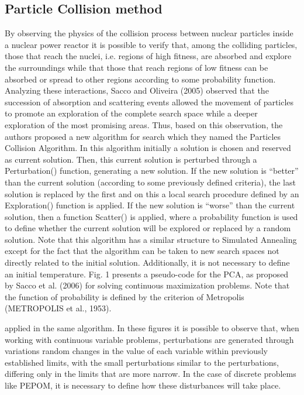 \subsection{Particle Collision method}
\label{sec:PC}

By observing the physics of the collision process between nuclear particles inside a nuclear power reactor it is possible to verify that, among the colliding particles, those that reach the nuclei, i.e. regions of high fitness, are absorbed and explore the surroundings while that those that reach regions of low fitness can be absorbed or spread to other regions according to some probability function. Analyzing these interactions, Sacco and Oliveira (2005) observed that the succession of absorption and scattering events allowed the movement of particles to promote an exploration of the complete search space while a deeper exploration of the most promising areas. Thus, based on this observation, the authors proposed a new algorithm for search which they named the Particles Collision Algorithm. In this algorithm initially a solution is chosen and reserved as current solution. Then, this current solution is perturbed through a Perturbation() function, generating a new solution. If the new solution is “better” than the current solution (according to some previously defined criteria), the last solution is replaced by the first and on this a local search procedure defined by an Exploration() function is applied. If the new solution is “worse” than the current solution, then a function Scatter() is applied, where a probability function is used to define whether the current solution will be explored or replaced by a random solution. Note that this algorithm has a similar structure to Simulated Annealing except for the fact that the algorithm can be taken to new search spaces not directly related to the initial solution. Additionally, it is not necessary to define an initial temperature. Fig. 1 presents a pseudo-code for the PCA, as proposed by Sacco et al. (2006) for solving continuous maximization problems. Note that the function of probability is defined by the criterion of Metropolis (METROPOLIS et al., 1953). 


applied in the same algorithm. In these figures it is possible to observe that, when working with continuous variable problems, perturbations are generated through variations random changes in the value of each variable within previously established limits, with the small perturbations similar to the perturbations, differing only in the limits that are more narrow. In the case of discrete problems like PEPOM, it is necessary to define how these disturbances will take place. 

